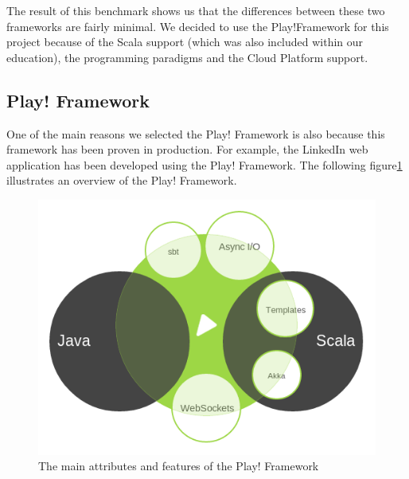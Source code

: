 The result of this benchmark shows us that the differences between these two frameworks are fairly minimal. We decided to use the Play!Framework for this project because of the Scala support (which was also included within our education), the programming paradigms and the Cloud Platform support.
\newpage

\subsection{Play! Framework}
  One of the main reasons we selected the Play! Framework is also because this framework has been proven in production. For example, the LinkedIn web application has been developed using the Play! Framework. The following figure\ref{play} illustrates an overview of the Play! Framework.\\
\begin{figure}[h!]
\centering
\includegraphics[scale=0.5]{./img/play.png}
\caption{\small{The main attributes and features of the Play! Framework}}
\label{play}
\end{figure}
 
